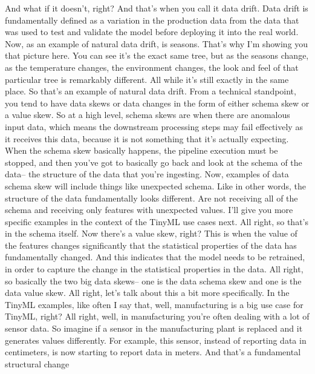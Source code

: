 {{{{    And what if it doesn't, right?
    And that's when you call it data drift.
    Data drift is fundamentally defined as a variation in the production data
    from the data that was used to test and validate the model before deploying it
    into the real world.
    Now, as an example of natural data drift, is seasons.
    That's why I'm showing you that picture here.
    You can see it's the exact same tree, but as the seasons change, as
    the temperature changes, the environment changes, the look and feel
    of that particular tree is remarkably different.
    All while it's still exactly in the same place.
    So that's an example of natural data drift.
    From a technical standpoint, you tend to have data skews or data
    changes in the form of either schema skew or a value skew.
    So at a high level, schema skews are when
    there are anomalous input data, which means the downstream processing
    steps may fail effectively as it receives this data,
    because it is not something that it's actually expecting.
    When the schema skew basically happens, the pipeline execution must be stopped,
    and then you've got to basically go back and look at the schema of the data--
    the structure of the data that you're ingesting.
    Now, examples of data schema skew will include things like unexpected schema.
    Like in other words, the structure of the data fundamentally looks different.
    Are not receiving all of the schema and receiving only features
    with unexpected values.
    I'll give you more specific examples in the context of the TinyML use cases
    next.
    All right, so that's in the schema itself.
    Now there's a value skew, right?
    This is when the value of the features changes significantly
    that the statistical properties of the data has fundamentally changed.
    And this indicates that the model needs to be retrained,
    in order to capture the change in the statistical properties in the data.
    All right, so basically the two big data skews-- one is the data schema skew
    and one is the data value skew.
    All right, let's talk about this a bit more specifically.
    In the TinyML examples, like often I say that, well, manufacturing
    is a big use case for TinyML, right?
    All right, well, in manufacturing you're often
    dealing with a lot of sensor data.
    So imagine if a sensor in the manufacturing plant is replaced
    and it generates values differently.
    For example, this sensor, instead of reporting data in centimeters,
    is now starting to report data in meters.
    And that's a fundamental structural change
}}}}
